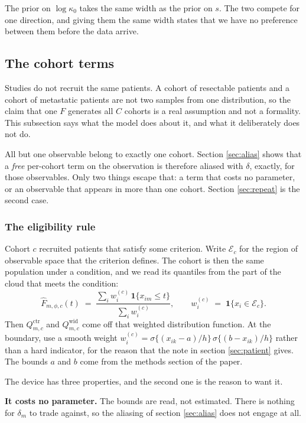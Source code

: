 \documentclass[11pt]{article}
\newcommand{\ctr}{\mathrm{ctr}}
\newcommand{\wid}{\mathrm{wid}}
\begin{document}
The prior on $\log\kappa_0$ takes the same width as the prior on $s$. The two
compete for one direction, and giving them the same width states that we have no
preference between them before the data arrive.

\subsection{The cohort terms}
\label{sec:cohort}

Studies do not recruit the same patients. A cohort of resectable patients and a
cohort of metastatic patients are not two samples from one distribution, so the
claim that one $F$ generates all $C$ cohorts is a real assumption and not a
formality. This subsection says what the model does about it, and what it
deliberately does not do.

All but one observable belong to exactly one cohort. Section \ref{sec:alias}
shows that a \emph{free} per-cohort term on the observation is therefore aliased
with $\delta$, exactly, for those observables. Only two things escape that: a
term that costs no parameter, or an observable that appears in more than one
cohort. Section \ref{sec:repeat} is the second case.

\subsubsection*{The eligibility rule}

Cohort $c$ recruited patients that satisfy some criterion. Write $\mathcal{E}_c$
for the region of observable space that the criterion defines. The cohort is then
the same population under a condition, and we read its quantiles from the part of
the cloud that meets the condition:
\begin{equation}
\widehat F_{m,\phi,c}(t) \;=\;
\frac{\sum_i w^{(c)}_i\,\mathbf 1\{x_{im}\le t\}}{\sum_i w^{(c)}_i},
\qquad
w^{(c)}_i \;=\; \mathbf 1\{x_i\in\mathcal{E}_c\}.
\label{eq:elig}
\end{equation}
Then $Q^\ctr_{m,c}$ and $Q^\wid_{m,c}$ come off that weighted distribution
function. At the boundary, use a smooth weight
$w^{(c)}_i=\sigma\{(x_{ik}-a)/h\}\,\sigma\{(b-x_{ik})/h\}$ rather than a hard
indicator, for the reason that the note in section \ref{sec:patient} gives. The
bounds $a$ and $b$ come from the methods section of the paper.

The device has three properties, and the second one is the reason to want it.

\textbf{It costs no parameter.} The bounds are read, not estimated. There is
nothing for $\delta_m$ to trade against, so the aliasing of section
\ref{sec:alias} does not engage at all.
\end{document}

